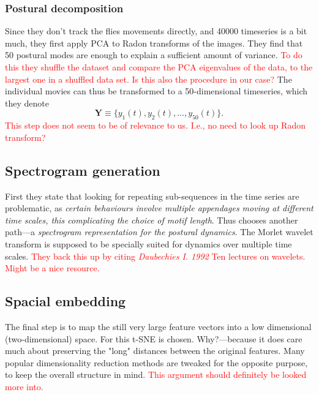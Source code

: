\documentclass{article}
\theoremstyle{plain}
\theoremstyle{definition}
\theoremstyle{remark}
\begin{document}
\subsubsection{Postural decomposition}
Since they don't track the flies movements directly, and 40000 timeseries is a bit much, they first apply PCA to Radon transforms of the images.
They find that 50 postural modes are enough to explain a sufficient amount of variance.
\textcolor{red}{To do this they shuffle the dataset and compare the PCA eigenvalues of the data, to the largest one in a shuffled data set.
Is this also the procedure in our case?}
The individual movies can thus be transformed to a 50-dimensional timeseries, which they denote
\begin{equation*}
        \mathbf{Y} \equiv \{ y_1(t), y_2(t), \hdots , y_{50}(t) \}.
\end{equation*}
\textcolor{red}{This step does not seem to be of relevance to us.
I.e., no need to look up Radon transform?}

\subsection{Spectrogram generation}
First they state that looking for repeating sub-sequences in the time series are problematic, as \textit{certain behaviours involve multiple appendages moving at different time scales, this complicating the choice of motif length}.
Thus \cite{Berman} chooses another path—a \textit{spectrogram representation for the postural dynamics}.
The Morlet wavelet transform is supposed to be specially suited for dynamics over multiple time scales.
\textcolor{red}{They back this up by citing \textit{Daubechies I. 1992} Ten lectures on wavelets.
Might be a nice resource.}

\subsection{Spacial embedding}
The final step is to map the still very large feature vectors into a low dimensional (two-dimensional) space.
For this t-SNE is chosen.
Why?—because it does care much about preserving the "long" distances between the original features.
Many popular dimensionality reduction methods are tweaked for the opposite purpose, to keep the overall structure in mind.
\textcolor{red}{This argument should definitely be looked more into.}





\newpage
\printbibliography
\end{document}
